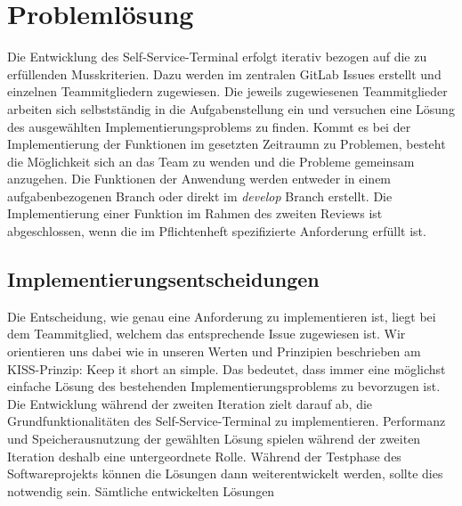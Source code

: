 \section{Problemlösung}
Die Entwicklung des Self-Service-Terminal erfolgt iterativ bezogen auf die zu erfüllenden Musskriterien. Dazu werden im zentralen GitLab Issues erstellt und einzelnen Teammitgliedern zugewiesen. Die jeweils zugewiesenen Teammitglieder arbeiten sich selbstständig in die Aufgabenstellung ein und versuchen eine Lösung des ausgewählten Implementierungsproblems zu finden. Kommt es bei der Implementierung der Funktionen im gesetzten Zeitraumn zu Problemen, besteht die Möglichkeit sich an das Team zu wenden und die Probleme gemeinsam anzugehen. Die Funktionen der Anwendung werden entweder in einem aufgabenbezogenen Branch oder direkt im \textit{develop} Branch erstellt. Die Implementierung einer Funktion im Rahmen des zweiten Reviews ist abgeschlossen, wenn die im Pflichtenheft spezifizierte Anforderung erfüllt ist.

\subsection{Implementierungsentscheidungen}
Die Entscheidung, wie genau eine Anforderung zu implementieren ist, liegt bei dem Teammitglied, welchem das entsprechende Issue zugewiesen ist. Wir orientieren uns dabei wie in unseren Werten und Prinzipien beschrieben am KISS-Prinzip: \glqq Keep it short an simple\grqq{}. Das bedeutet, dass immer eine möglichst einfache Lösung des bestehenden Implementierungsproblems zu bevorzugen ist. Die Entwicklung während der zweiten Iteration zielt darauf ab, die Grundfunktionalitäten des Self-Service-Terminal zu implementieren. Performanz und Speicherausnutzung der gewählten Lösung spielen während der zweiten Iteration deshalb eine untergeordnete Rolle. Während der Testphase des Softwareprojekts können die Lösungen dann weiterentwickelt werden, sollte dies notwendig sein. Sämtliche entwickelten Lösungen 